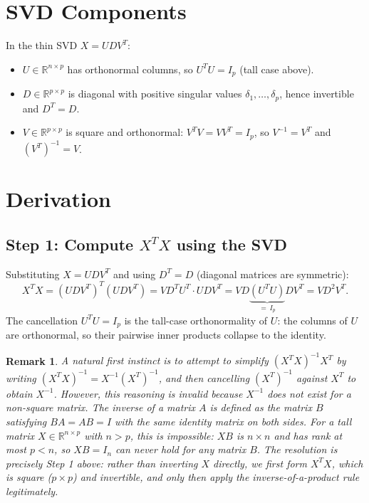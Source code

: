 \documentclass{article}
\newtheorem*{remark}{Remark}
\begin{document}
\section*{SVD Components}

In the thin SVD $X = UDV^T$:
\begin{itemize}
    \item $U \in \mathbb{R}^{n \times p}$ has orthonormal columns, so $U^T U = I_p$
          (tall case above).
    \item $D \in \mathbb{R}^{p \times p}$ is diagonal with positive singular values
          $\delta_1, \ldots, \delta_p$, hence invertible and $D^T = D$.
    \item $V \in \mathbb{R}^{p \times p}$ is square and orthonormal:
          $V^TV = VV^T = I_p$, so $V^{-1} = V^T$ and $(V^T)^{-1} = V$.
\end{itemize}

\section*{Derivation}

\subsection*{Step 1: Compute $X^TX$ using the SVD}

Substituting $X = UDV^T$ and using $D^T = D$ (diagonal matrices are symmetric):
\[
    X^T X = (UDV^T)^T(UDV^T) = VD^T U^T \cdot UDV^T = VD \underbrace{(U^TU)}_{=\, I_p} DV^T = VD^2V^T.
\]
The cancellation $U^TU = I_p$ is the tall-case orthonormality of $U$: the columns of $U$
are orthonormal, so their pairwise inner products collapse to the identity.

\begin{remark}
A natural first instinct is to attempt to simplify $(X^TX)^{-1}X^T$ by writing
$(X^TX)^{-1} = X^{-1}(X^T)^{-1}$, and then cancelling $(X^T)^{-1}$ against $X^T$ to
obtain $X^{-1}$. However, this reasoning is invalid because $X^{-1}$ does not exist for
a non-square matrix. The inverse of a matrix $A$ is defined as the matrix $B$ satisfying
$BA = AB = I$ with the same identity matrix on both sides. For a tall matrix
$X \in \mathbb{R}^{n \times p}$ with $n > p$, this is impossible: $XB$ is $n \times n$
and has rank at most $p < n$, so $XB = I_n$ can never hold for any matrix $B$. The
resolution is precisely Step 1 above: rather than inverting $X$ directly, we first form
$X^TX$, which \emph{is} square ($p \times p$) and invertible, and only then apply the
inverse-of-a-product rule legitimately.
\end{remark}
\end{document}
